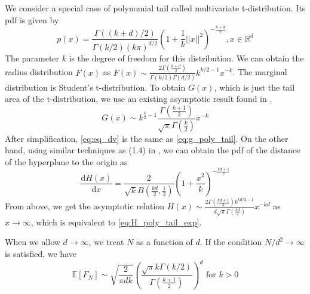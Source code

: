 \documentclass{aptpub}
\def\E{\mathbb{E}}
\def\d{\mathrm{d}}
\begin{document}
\begin{example}
     We consider a special case of polynomial tail called multivariate t-distribution.
     Its pdf is given by
     \begin{equation}\label{eq:pxy_student_t}
          p(x) = \frac{\Gamma((k+d)/2)}{\Gamma(k/2)(k\pi)^{d/2}}
          \left(1+\frac{1}{k}||x||^2
          \right)^{-\frac{k+d}{2}}, x \in \mathbb{R}^d
      \end{equation}
      The parameter $k$ is the degree of freedom for this distribution.
      We can obtain the radius distribution
      $F(x)$ as $F(x) \sim \frac{2\Gamma(\frac{k+d}{2})}{\Gamma(k/2)\Gamma(d/2)} k^{k/2-1} x^{-k}$.
      The marginal distribution is Student's t-distribution. To obtain $G(x)$, which is just the tail area
of the t-distribution, we use an existing asymptotic result found in \cite{andrew1976}.
\begin{equation} \label{eq:eq_dv}
    G(x) \sim k^{\frac{k}{2}-1} \frac{\Gamma \left(\frac{k+1}{2} \right)}
    {\sqrt{\pi} \Gamma\left(\frac{k}{2}\right)}x^{-k}
\end{equation}
After simplification, \eqref{eq:eq_dv} is the same as \eqref{eq:g_poly_tail}.
On the other hand, using similar techniques as (1.4) in \cite{raynaud1970enveloppe},
we can obtain the pdf of the distance of the hyperplane to the origin as
\begin{equation}
     \frac{\d H(x)}{\d x} =  \frac{2}{\sqrt{k} B(\frac{kd}{2},\frac{1}{2})} \left(1 + \frac{x^2}{k} \right)^{-\frac{kd+1}{2}} 
\end{equation}
From above, we get the asymptotic relation $H(x) \sim \frac{2 \Gamma(\frac{kd+1}{2}) k^{kd/2-1}}{d\sqrt{\pi} \Gamma(\frac{kd}{2})}
x^{-kd}$ as $x\to \infty$, which is equivalent to \eqref{eq:H_poly_tail_exp}.

\end{example}
When we allow $d\to \infty$, we treat $N$ as a function of $d$.
If the condition $N/d^2 \to \infty$ is satisfied, we have
\begin{equation}\label{eq:poly_E_F_N_d_infty}
\E[F_N] \sim \sqrt{\frac{2}{\pi dk}}\left(
     \frac{\sqrt{\pi}k \Gamma(k/2)}
     {\Gamma(\frac{k+1}{2})}
 \right)^d \textrm{ for } k>0
\end{equation}
\end{document}
